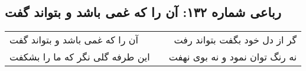 \begin{center}
\section*{رباعی شماره ۱۳۲: آن را که غمی باشد و بتواند گفت}
\label{sec:0132}
\begin{longtable}{l p{0.5cm} r}
آن را که غمی باشد و بتواند گفت
&&
گر از دل خود بگفت بتواند رفت
\\
این طرفه گلی نگر که ما را بشکفت
&&
نه رنگ توان نمود و نه بوی نهفت
\\
\end{longtable}
\end{center}
